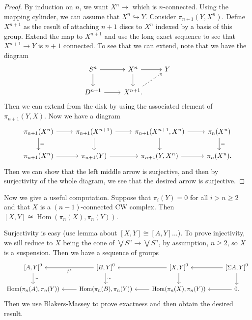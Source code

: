 \documentclass[leqno, openany]{memoir}
\theoremstyle{definition}
\theoremstyle{remark}
\theoremstyle{plain}
\theoremstyle{definition}
\theoremstyle{remark}
\DeclareMathOperator{\Hom}{Hom}
\begin{document}
\begin{proof}
    By induction on $n$, we want $X^n \to $ which is $n$-connected. Using the mapping cylinder, we can assume that $X^n \hookrightarrow Y$. Consider $\pi_{n+1}(Y, X^n)$. Define $X^{n+1}$ as the result of attaching $n+1$ discs to $X^n$ indexed by a basis of this group. Extend the map to $X^{n+1}$ and use the long exact sequence to see that $X^{n+1} \to Y$ is $n+1$ connected. To see that we can extend, note that we have the diagram
    \begin{equation*}
    \begin{tikzcd}
        S^n \arrow{r} \arrow{d} & X^n \arrow{r} \arrow{d} & Y \\
        D^{n+1} \arrow{r} & X^{n+1}. \arrow[dashrightarrow]{ur}
    \end{tikzcd}
    \end{equation*}
    Then we can extend from the disk by using the associated element of $\pi_{n+1}(Y,X)$. Now we have a diagram
    \begin{equation*}
    \begin{tikzcd}
        \pi_{n+1}(X^n) \arrow{r} \arrow{d}{=} & \pi_{n+1}(X^{n+1}) \arrow{d} \arrow{r} & \pi_{n+1}(X^{n+1},X^n) \arrow{r} \arrow{d} & \pi_n(X^n) \arrow{d}{=} \\
        \pi_{n+1}(X^n) \arrow{r} & \pi_{n+1}(Y) \arrow{r} & \pi_{n+1}(Y, X^n) \arrow{r} & \pi_n(X^n).
    \end{tikzcd}
    \end{equation*}
    Then we can show that the left middle arrow is surjective, and then by surjectivity of the whole diagram, we see that the desired arrow is surjective.
\end{proof}

Now we give a useful computation. Suppose that $\pi_i(Y) = 0$ for all $i > n \geq 2$ and that $X$ is a $(n-1)$-connected CW complex. Then $[X,Y] \cong \Hom(\pi_n(X), \pi_n(Y))$.

Surjectivity is easy (use lemma about $[X,Y] \cong [A,Y] \ldots$). To prove injectivity, we sill reduce to $X$ being the cone of $\bigvee S^n \to \bigvee S^n$, by assumption, $n \geq 2$, so $X$ is a suspension. Then we have a sequence of groups
\begin{equation*}
\begin{tikzcd}
    { [A,Y] }^0 \arrow{d}{\sim} & { [B,Y] }^0 \arrow{l}{\phi^*} \arrow{d}{\sim} & { [X,Y] }^0 \arrow{d} \arrow{l} & { [\Sigma A, Y] }^0 \arrow{l} \arrow{d} \\
    \Hom(\pi_n(A), \pi_n(Y)) & \Hom(\pi_n(B), \pi_n(Y)) \arrow{l} & \Hom(\pi_n(X), \pi_n(Y)) \arrow{l} & 0. \arrow{l}
\end{tikzcd}
\end{equation*}
Then we use Blakers-Massey to prove exactness and then obtain the desired result.
\end{document}
